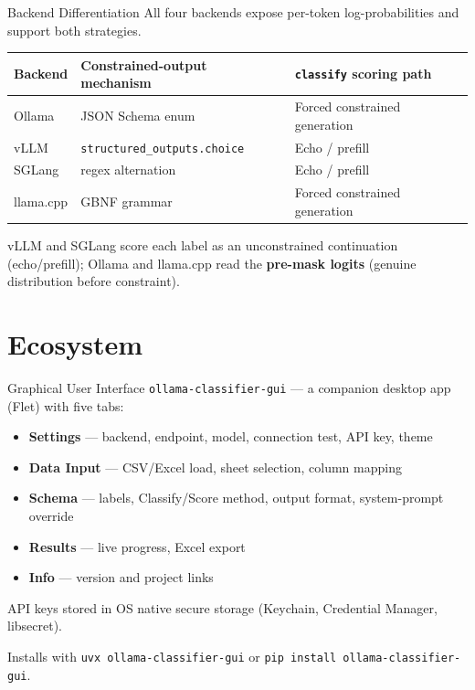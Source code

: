 \documentclass[aspectratio=169,11pt]{beamer}
\begin{document}
\begin{frame}{Backend Differentiation}
  All four backends expose per-token log-probabilities and support both
  strategies.

  \vspace{0.4em}
  \centering
  \footnotesize
  \begin{tabular}{lll}
    \toprule
    \textbf{Backend} & \textbf{Constrained-output mechanism} &
    \textbf{\texttt{classify} scoring path} \\
    \midrule
    Ollama    & JSON Schema enum & Forced constrained generation \\
    vLLM      & \texttt{structured\_outputs.choice} & Echo / prefill \\
    SGLang    & regex alternation & Echo / prefill \\
    llama.cpp & GBNF grammar & Forced constrained generation \\
    \bottomrule
  \end{tabular}

  \vspace{0.5em}
  \normalsize
  vLLM and SGLang score each label as an unconstrained continuation
  (echo/prefill); Ollama and llama.cpp read the \textbf{pre-mask logits}
  (genuine distribution before constraint).
\end{frame}

\section{Ecosystem}

\begin{frame}{Graphical User Interface}
  \texttt{ollama-classifier-gui} — a companion desktop app (Flet) with five
  tabs:
  \begin{itemize}
    \item \textbf{Settings} — backend, endpoint, model, connection test, API
          key, theme
    \item \textbf{Data Input} — CSV/Excel load, sheet selection, column
          mapping
    \item \textbf{Schema} — labels, Classify/Score method, output format,
          system-prompt override
    \item \textbf{Results} — live progress, Excel export
    \item \textbf{Info} — version and project links
  \end{itemize}

  \vspace{0.3em}
  API keys stored in OS native secure storage (Keychain, Credential Manager,
  libsecret).

  Installs with \texttt{uvx ollama-classifier-gui} or
  \texttt{pip install ollama-classifier-gui}.
\end{frame}
\end{document}
